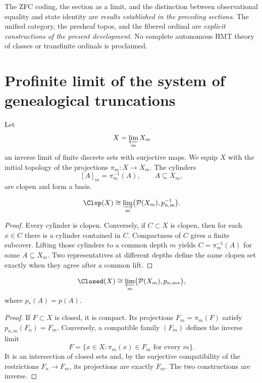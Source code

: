 \begin{remark}
The ZFC coding, the section as a limit, and the distinction between observational
equality and state identity are
\emph{results established in the preceding sections}. The unified category, the presheaf
topos, and the fibered ordinal are
\emph{explicit constructions of the present development}. No complete autonomous HMT theory
of classes or transfinite ordinals is proclaimed.
\end{remark}


\section{Profinite limit of the system of genealogical truncations}

Let
\[
  X=\varprojlim_mX_m
\]
an inverse limit of finite discrete sets with surjective maps.
We equip \(X\) with the initial topology of the projections
\(\pi_m:X\to X_m\). The cylinders
\[
  [A]_m=\pi_m^{-1}(A),
  \qquad A\subseteq X_m,
\]
are clopen and form a basis.

\begin{theorem}
\label{p3-83-c45-s2:thm:clopen-power}
\[
  \Clop(X)
  \cong
  \varinjlim_m\bigl(\mathcal P(X_m),p_{n,m}^{-1}\bigr).
\]
\end{theorem}

\begin{proof}
Every cylinder is clopen. Conversely, if \(C\subset X\) is clopen, then for
each \(x\in C\) there is a cylinder contained in \(C\). Compactness of \(C\)
gives a finite subcover. Lifting those cylinders to a common
depth \(m\) yields \(C=\pi_m^{-1}(A)\) for some
\(A\subseteq X_m\). Two representatives at different depths define the
same clopen set exactly when they agree after a common lift.
\end{proof}

\begin{theorem}
\label{p3-83-c45-s2:thm:closed-power}
\[
  \Closed(X)
  \cong
  \varprojlim_m\bigl(\mathcal P(X_m),p_{n,m*}\bigr),
\]
where \(p_*(A)=p(A)\).
\end{theorem}

\begin{proof}
If \(F\subset X\) is closed, it is compact. Its projections
\(F_m=\pi_m(F)\) satisfy \(p_{n,m}(F_n)=F_m\). Conversely, a compatible family
\((F_m)\) defines the inverse limit
\[
  F=\{x\in X:\pi_m(x)\in F_m\text{ for every }m\}.
\]
It is an intersection of closed sets and, by the surjective compatibility
of the restrictions \(F_n\to F_m\), its projections are exactly
\(F_m\). The two constructions are inverse.
\end{proof}

